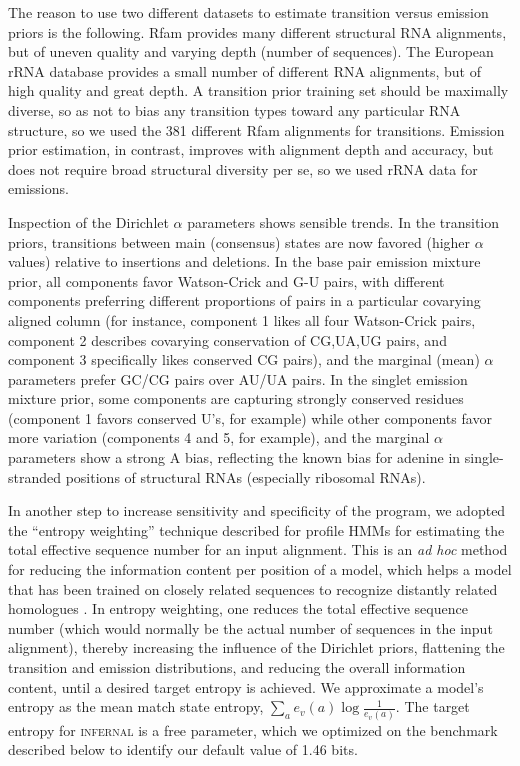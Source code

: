 \documentclass[11pt]{article}
\newif\ifdraft
\begin{document}
The reason to use two different datasets to estimate transition versus
emission priors is the following. Rfam provides many different
structural RNA alignments, but of uneven quality and varying depth
(number of sequences). The European rRNA database provides a small
number of different RNA alignments, but of high quality and great
depth.  A transition prior training set should be maximally diverse,
so as not to bias any transition types toward any particular RNA
structure, so we used the 381 different Rfam alignments for
transitions.  Emission prior estimation, in contrast, improves with
alignment depth and accuracy, but does not require broad structural
diversity per se, so we used rRNA data for emissions.

Inspection of the Dirichlet $\alpha$ parameters shows sensible
trends. In the transition priors, transitions between main (consensus)
states are now favored (higher $\alpha$ values) relative to insertions
and deletions.
In the base pair emission mixture prior, all components
favor Watson-Crick and G-U pairs, with different components preferring
different proportions of pairs in a particular covarying aligned
column (for instance, component 1 likes all four Watson-Crick pairs,
component 2 describes covarying conservation of CG,UA,UG pairs, and
component 3 specifically likes conserved CG pairs), and the marginal
(mean) $\alpha$ parameters prefer GC/CG pairs over AU/UA pairs. In the
singlet emission mixture prior, some components are capturing strongly
conserved residues (component 1 favors conserved U's, for example)
while other components favor more variation (components 4 and 5, for
example), and the marginal $\alpha$ parameters show a strong A bias,
reflecting the known bias for adenine in single-stranded positions of
structural RNAs (especially ribosomal RNAs).


\ifdraft

\fi

\ifdraft

\fi

\ifdraft

\fi

In another step to increase sensitivity and specificity of the
program, we adopted the ``entropy weighting'' technique described for
profile HMMs \cite{Karplus98} for estimating the total effective
sequence number for an input alignment. This is an \emph{ad hoc}
method for reducing the information content per position of a model,
which helps a model that has been trained on closely related sequences
to recognize distantly related homologues \cite{Altschul91}. In
entropy weighting, one reduces the total effective sequence number
(which would normally be the actual number of sequences in the input
alignment), thereby increasing the influence of the Dirichlet priors,
flattening the transition and emission distributions, and reducing the
overall information content, until a desired target entropy is
achieved. We approximate a model's entropy as the mean match state
entropy, $\sum_a e_v(a) \log \frac{1}{e_v(a)}$. The target entropy for
\textsc{infernal} is a free parameter, which we optimized on the
benchmark described below to identify our default value of 1.46 bits.
\end{document}
